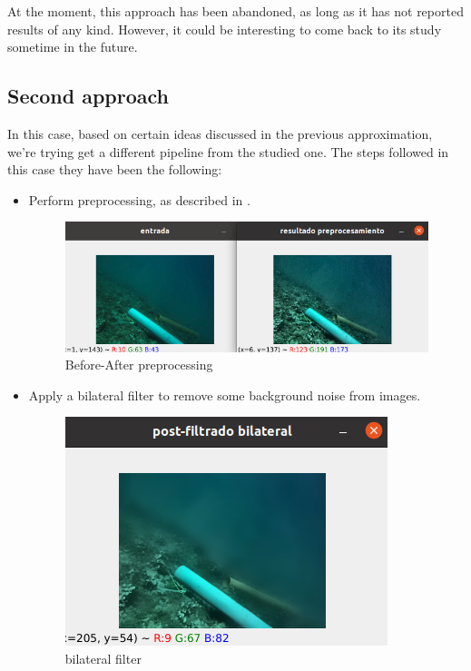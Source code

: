 \documentclass[12pt, a4paper]{article}
\begin{document}
At the moment, this approach has been abandoned, as long as it has not reported results of any kind. However, it could be 
interesting to come back to its study sometime in the future. 


\subsection{Second approach}\label{ch:second_approach}



In this case, based on certain ideas discussed in the previous approximation,
we're trying get a different pipeline from the studied one.  The steps followed
in this case they have been the following:

\begin{itemize}
    
    \item Perform preprocessing, as described in .
    
    \begin{figure}[H]
        \centering
        \includegraphics[scale=0.3]{images_doc/preprocess.png}
        \caption{Before-After preprocessing}
        \label{fig:pprepre}
    \end{figure}

    \item Apply a bilateral filter to remove some background noise from images.
    
    \begin{figure}[H]
        \centering
        \includegraphics[scale=0.3]{images_doc/filtradobilat.png}
        \caption{bilateral filter}
        \label{fig:bilat}
    \end{figure}


\end{itemize}
\end{document}
